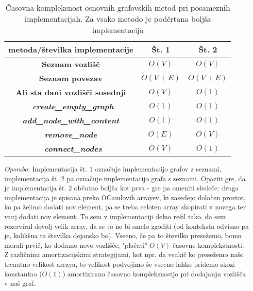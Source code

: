 \documentclass[mat1, tisk]{fmfdelo}
\begin{document}
\begin{table}[h]
\centering
\begin{tabular}{|c|c|c|}
  \hline
  \textbf{metoda/številka implementacije} & \textbf{Št. 1} & \textbf{Št. 2} \\
  \hline
  \textbf{Seznam vozlišč} & \underline{$O(V)$} & \underline{$O(V)$} \\
  \hline
  \textbf{Seznam povezav} & \underline{$O(V+E)$} & \underline{$O(V+E)$} \\
  \hline
  \textbf{Ali sta dani vozlišči sosednji} & $O(V)$ & \underline{$O(1)$} \\
  \hline
  \textbf{~\textit{create\_empty\_graph}} & \underline{$O(1)$} & \underline{$O(1)$} \\
  \hline
  \textbf{\textit{add\_node\_with\_content}} & \underline{$O(1)$} & \underline{$O(1)$} \\
  \hline
  \textbf{\textit{remove\_node}} & $O(E)$ & \underline{$O(V)$} \\
  \hline
  \textbf{~\textit{connect\_nodes}} & $O(V)$ & \underline{$O(1)$} \\
  \hline
\end{tabular}
\caption{Časovna kompleksnost osnovnih grafovskih metod pri posameznih implementacijah. Za vsako metodo je podčrtana boljša implementacija}
\label{tab:casovna_kompleksnost_osnovnih_metod_na_grafih}
\end{table}
  
\textit{Opomba}: Implementacija št. $1$ označuje implementacijo grafov z seznami, implementacija št. $2$ pa označuje implementacijo grafa s seznami.
Opaziti gre, da je implementacija št. 2 občutno boljša kot prva - gre pa omeniti sledeče: druga implementacija je spisana preko OCamlovih arrayev, ki
zasedejo določen prostor, ko pa želimo dodati nov element, pa se treba celoten array skopirati v novega ter vanj dodati nov element. To sem v implementaciji
delno rešil tako, da sem rezerviral dovolj velik array, da se to ne bi smelo zgoditi (od konteksta odvisno pa je, kolikšna ta številka dejansko bo).
Vseeno, če pa to številko presežemo, bomo morali prvič, ko dodamo novo vozlišče, "plačati" $O(V)$ časovne komplekstnosti.
Z različnimi amortizacijskimi strategijami, kot npr. da vsakič ko presežemo našo trenutno velikost arraya, to velikost podvojimo še vseeno lahko pridemo
skozi konstantno ($O(1)$) amortizirano časovno kompleksnostjo pri dodajanju vozlišča v naš graf.
  
\end{document}
